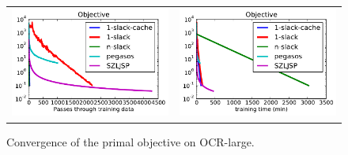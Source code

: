 \begin{figure}
    \begin{tabu} to 
    \includegraphics[width=\linewidth]{evaluation/images/letters_big}&%
    \includegraphics[width=\linewidth]{evaluation/images/letters_big_time}
    \end{tabu}
\caption{%
   Convergence of the primal objective on OCR-large. 
}
\end{figure}

